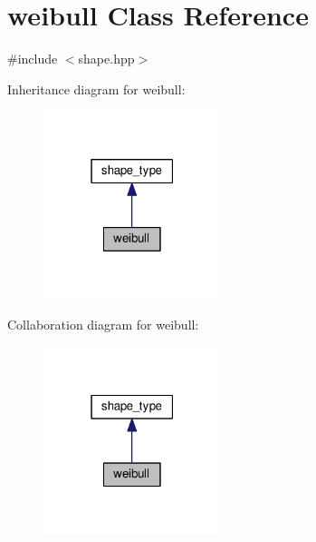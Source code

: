 \hypertarget{classweibull}{}\section{weibull Class Reference}
\label{classweibull}


{\ttfamily \#include $<$shape.\+hpp$>$}



Inheritance diagram for weibull\+:\nopagebreak
\begin{figure}[H]
\begin{center}
\leavevmode
\includegraphics[width=147pt]{d2/d07/classweibull__inherit__graph}
\end{center}
\end{figure}


Collaboration diagram for weibull\+:\nopagebreak
\begin{figure}[H]
\begin{center}
\leavevmode
\includegraphics[width=147pt]{db/d7a/classweibull__coll__graph}
\end{center}
\end{figure}
